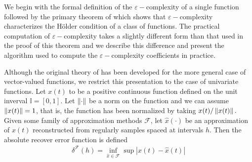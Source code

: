   
  We begin with the formal definition of the $\varepsilon-$complexity of a single function followed by the primary theorem of \cite{darkhovsky2013} which shows that $\varepsilon-$complexity  characterizes the H\"older condition of a class of functions. The practical computation of $\varepsilon-$complexity takes a slightly different form than that used in the proof of this theorem and we describe this difference and present the algorithm used to compute the $\varepsilon-$complexity coefficients in practice. 


   Although the original theory of 
  has been developed for the more general case of vector-valued 
  functions, we restrict this presentation to the case of 
  univariate functions.
  Let $x(t)$ to be a positive continuous function defined on the 
  unit inverval $ \mathbb{I} = [0,1]$. Let $\left\lVert\cdot\right\rVert$ be a norm on the function and we can assume $\left\lVert x(t)\right\rVert = 1$, that is, the function has been normalized 
  by taking $x(t)/\left\lVert x(t)\right\rVert.$ Given some family of approximation 
  methods $\mathcal{F}$, let $\hat x(\cdot)$ be an approximation
  of $x(t)$ reconstructed from regularly samples spaced at intervals $h$. Then the absolute recover error function is defined 
  \begin{align}
    \delta^{\mathcal{F}}(h) = \inf_{\hat x \in \mathcal{F}} 
    \sup | x(t) - \hat x(t)|
  \end{align}

